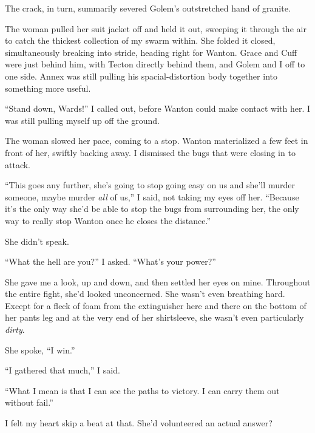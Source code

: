 The crack, in turn, summarily severed Golem's outstretched hand of granite.



The woman pulled her suit jacket off and held it out, sweeping it through the air to catch the thickest collection of my swarm within.  She folded it closed, simultaneously breaking into stride, heading right for Wanton.  Grace and Cuff were just behind him, with Tecton directly behind them, and Golem and I off to one side.  Annex was still pulling his spacial-distortion body together into something more useful.



``Stand down, Wards!'' I called out, before Wanton could make contact with her.  I was still pulling myself up off the ground.



The woman slowed her pace, coming to a stop.  Wanton materialized a few feet in front of her, swiftly backing away.  I dismissed the bugs that were closing in to attack.



``This goes any further, she's going to stop going easy on us and she'll murder someone, maybe murder \emph{all} of us,'' I said, not taking my eyes off her.  ``Because it's the only way she'd be able to stop the bugs from surrounding her, the only way to really stop Wanton once he closes the distance.''



She didn't speak.



``What the hell are you?'' I asked.  ``What's your power?''



She gave me a look, up and down, and then settled her eyes on mine.  Throughout the entire fight, she'd looked unconcerned.  She wasn't even breathing hard.  Except for a fleck of foam from the extinguisher here and there on the bottom of her pants leg and at the very end of her shirtsleeve, she wasn't even particularly \emph{dirty}.



She spoke, ``I win.''



``I gathered that much,'' I said.



``What I mean is that I can see the paths to victory.  I can carry them out without fail.''



I felt my heart skip a beat at that.  She'd volunteered an actual answer?



